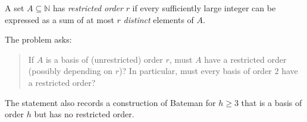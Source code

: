 A set $A\subseteq\mathbb{N}$ has \emph{restricted order} $r$ if every sufficiently large integer can be expressed as a sum of at most $r$ \emph{distinct} elements of $A$.

The problem asks:
\begin{quote}
If $A$ is a basis of (unrestricted) order $r$, must $A$ have a restricted order (possibly depending on $r$)?
In particular, must every basis of order $2$ have a restricted order?
\end{quote}
The statement also records a construction of Bateman for $h\ge 3$ that is a basis of order $h$ but has no restricted order.
